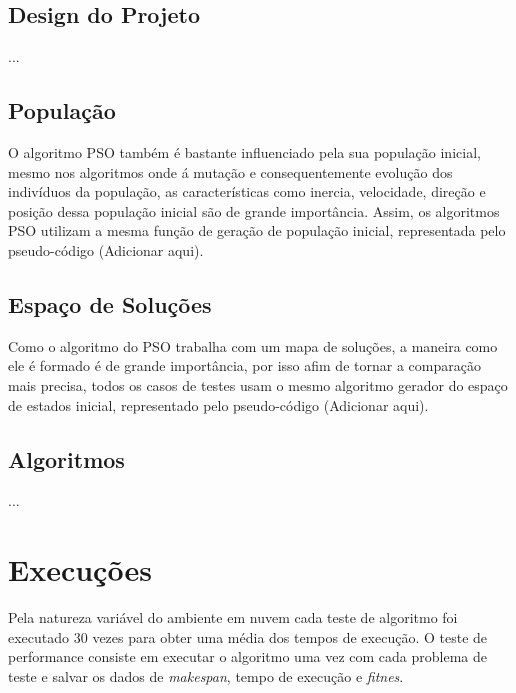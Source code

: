     \subsection{Design do Projeto}
        ...


    \subsection{População}
        O algoritmo PSO também é bastante influenciado pela sua população inicial, mesmo nos algoritmos onde á mutação e consequentemente evolução dos indivíduos da população, as características como inercia, velocidade, direção e posição dessa população inicial são de grande importância. Assim, os algoritmos PSO utilizam a mesma função de geração de população inicial, representada pelo pseudo-código (Adicionar aqui).


    \subsection{Espaço de Soluções}
        Como o algoritmo do PSO trabalha com um mapa de soluções, a maneira como ele é formado é de grande importância, por isso afim de tornar a comparação mais precisa, todos os casos de testes usam o mesmo algoritmo gerador do espaço de estados inicial, representado pelo pseudo-código (Adicionar aqui).


    \subsection{Algoritmos}
        ...
    



\section{Execuções}
    Pela natureza variável do ambiente em nuvem cada teste de algoritmo foi executado 30 vezes para obter uma média dos tempos de execução. O teste de performance consiste em executar o algoritmo uma vez com cada problema de teste e salvar os dados de \textit{makespan}, tempo de execução e \textit{fitnes}.

